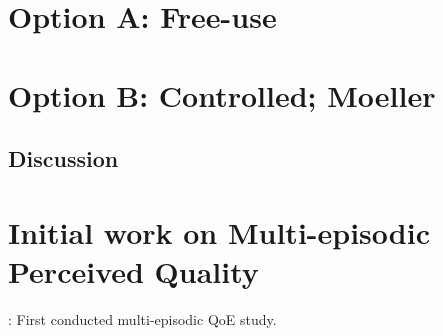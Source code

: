 \section{Option A: Free-use}

\section{Option B: Controlled; Moeller} %

\subsection{Discussion}

\section{Initial work on Multi-episodic Perceived Quality}

\cite{moller_single-call_2011}: First conducted multi-episodic QoE study.

